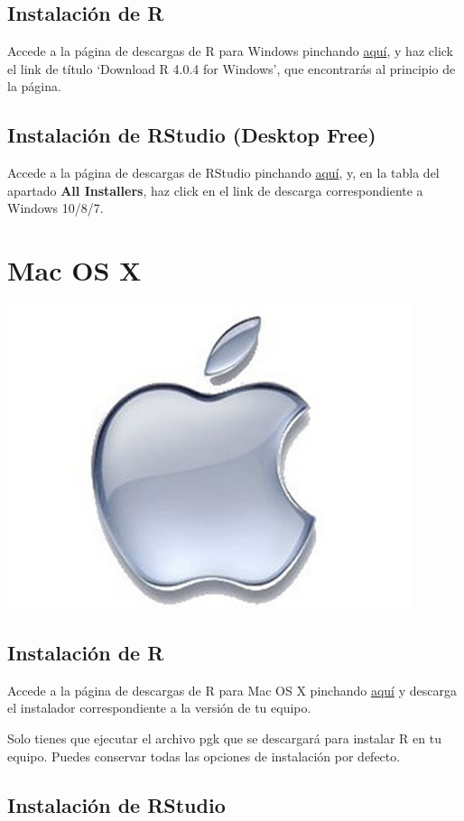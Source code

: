 \documentclass[]{book}
\begin{document}
\hypertarget{instalaciuxf3n-de-r-1}{%
\section{Instalación de R}\label{instalaciuxf3n-de-r-1}}

Accede a la página de descargas de R para Windows pinchando \href{https://ftp.cixug.es/CRAN/bin/windows/base/}{aquí}, y haz click el link de título `Download R 4.0.4 for Windows', que encontrarás al principio de la página.

\hypertarget{instalaciuxf3n-de-rstudio-desktop-free}{%
\section{Instalación de RStudio (Desktop Free)}\label{instalaciuxf3n-de-rstudio-desktop-free}}

Accede a la página de descargas de RStudio pinchando \href{https://rstudio.com/products/rstudio/download/\#download}{aquí}, y, en la tabla del apartado \textbf{All Installers}, haz click en el link de descarga correspondiente a Windows 10/8/7.

\hypertarget{mac-os-x}{%
\chapter{Mac OS X}\label{mac-os-x}}

\begin{center}\includegraphics[width=0.15\linewidth]{images/os/apple} \end{center}

\hypertarget{instalaciuxf3n-de-r-2}{%
\section{Instalación de R}\label{instalaciuxf3n-de-r-2}}

Accede a la página de descargas de R para Mac OS X pinchando \href{https://ftp.cixug.es/CRAN/bin/macosx/}{aquí} y descarga el instalador correspondiente a la versión de tu equipo.

Solo tienes que ejecutar el archivo pgk que se descargará para instalar R en tu equipo. Puedes conservar todas las opciones de instalación por defecto.

\hypertarget{instalaciuxf3n-de-rstudio}{%
\section{Instalación de RStudio}\label{instalaciuxf3n-de-rstudio}}
\end{document}
